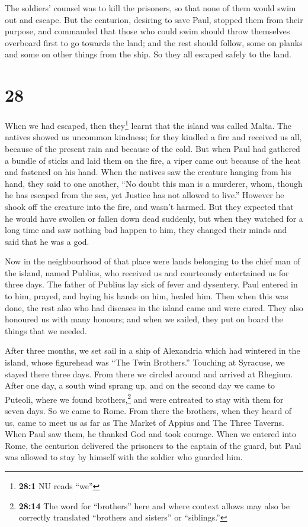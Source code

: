  The soldiers' counsel was to kill the prisoners, so that
none of them would swim out and escape.  But the
centurion, desiring to save Paul, stopped them from their purpose, and
commanded that those who could swim should throw themselves overboard
first to go towards the land;  and the rest should
follow, some on planks and some on other things from the ship. So they
all escaped safely to the land.

\hypertarget{section-27}{%
\section{28}\label{section-27}}

 When we had escaped, then they\footnote{\textbf{28:1} NU
  reads ``we''} learnt that the island was called Malta. 
The natives showed us uncommon kindness; for they kindled a fire and
received us all, because of the present rain and because of the cold.
 But when Paul had gathered a bundle of sticks and laid
them on the fire, a viper came out because of the heat and fastened on
his hand.  When the natives saw the creature hanging from
his hand, they said to one another, ``No doubt this man is a murderer,
whom, though he has escaped from the sea, yet Justice has not allowed to
live.''  However he shook off the creature into the fire,
and wasn't harmed.  But they expected that he would have
swollen or fallen down dead suddenly, but when they watched for a long
time and saw nothing bad happen to him, they changed their minds and
said that he was a god.

 Now in the neighbourhood of that place were lands
belonging to the chief man of the island, named Publius, who received us
and courteously entertained us for three days.  The father
of Publius lay sick of fever and dysentery. Paul entered in to him,
prayed, and laying his hands on him, healed him.  Then
when this was done, the rest also who had diseases in the island came
and were cured.  They also honoured us with many honours;
and when we sailed, they put on board the things that we needed.

 After three months, we set sail in a ship of Alexandria
which had wintered in the island, whose figurehead was ``The Twin
Brothers.''  Touching at Syracuse, we stayed there three
days.  From there we circled around and arrived at
Rhegium. After one day, a south wind sprang up, and on the second day we
came to Puteoli,  where we found brothers,\footnote{\textbf{28:14}
  The word for ``brothers'' here and where context allows may also be
  correctly translated ``brothers and sisters'' or ``siblings.''} and
were entreated to stay with them for seven days. So we came to Rome.
 From there the brothers, when they heard of us, came to
meet us as far as The Market of Appius and The Three Taverns. When Paul
saw them, he thanked God and took courage.  When we
entered into Rome, the centurion delivered the prisoners to the captain
of the guard, but Paul was allowed to stay by himself with the soldier
who guarded him.

